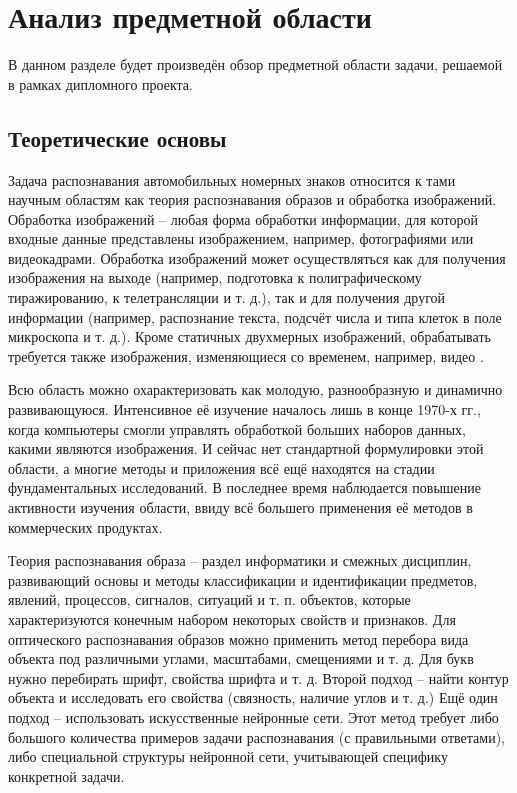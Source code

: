 \section{Анализ предметной области}
\label{sec:domain}

В данном разделе будет произведён обзор предметной области задачи, решаемой в рамках дипломного проекта.

\subsection{Теоретические основы}
\label{sub:domain:theory_basics}
Задача распознавания автомобильных номерных знаков относится к тами научным областям как теория распознавания образов и обработка изображений.
Обработка изображений -- любая форма обработки информации, для которой входные данные представлены изображением, например, фотографиями или видеокадрами. Обработка изображений может осуществляться как для получения изображения на выходе (например, подготовка к полиграфическому тиражированию, к телетрансляции и т. д.), так и для получения другой информации (например, распознание текста, подсчёт числа и типа клеток в поле микроскопа и т. д.). Кроме статичных двухмерных изображений, обрабатывать требуется также изображения, изменяющиеся со временем, например, видео \cite{image_precessing}.

Всю область можно охарактеризовать как молодую, разнообразную и динамично развивающуюся. Интенсивное её изучение началось лишь в конце 1970-х гг., когда компьютеры смогли управлять обработкой больших наборов данных, какими являются изображения. И сейчас нет стандартной формулировки этой области, а многие методы и приложения всё ещё находятся на стадии фундаментальных исследований. В последнее время наблюдается повышение активности изучения области, ввиду всё большего применения её методов в коммерческих продуктах.

Теория распознавания образа -- раздел информатики и смежных дисциплин, развивающий основы и методы классификации и идентификации предметов, явлений, процессов, сигналов, ситуаций и т. п. объектов, которые характеризуются конечным набором некоторых свойств и признаков.
Для оптического распознавания образов можно применить метод перебора вида объекта под различными углами, масштабами, смещениями и т. д. Для букв нужно перебирать шрифт, свойства шрифта и т. д.
Второй подход -- найти контур объекта и исследовать его свойства (связность, наличие углов и т. д.)
Ещё один подход -- использовать искусственные нейронные сети. Этот метод требует либо большого количества примеров задачи распознавания (с правильными ответами), либо специальной структуры нейронной сети, учитывающей специфику конкретной задачи.

